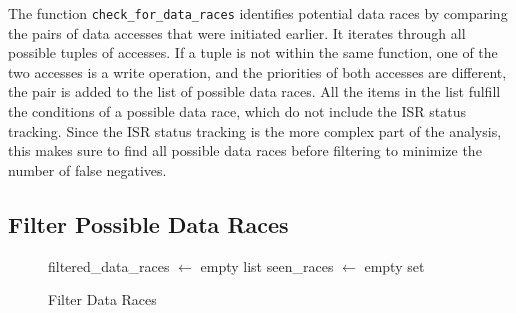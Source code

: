 \documentclass[
fancyheadings, %
%
%
]{stsreprt}
\begin{document}
{		The function \texttt{check\_for\_data\_races} identifies potential data races by comparing the pairs of data accesses that were initiated earlier. It iterates through all possible tuples of accesses. If a tuple is not within the same function, one of the two accesses is a write operation, and the priorities of both accesses are different, the pair is added to the list of possible data races. All the items in the list fulfill the conditions of a possible data race, which do not include the \ac{ISR} status tracking. Since the \ac{ISR} status tracking is the more complex part of the analysis, this makes sure to find all possible data races before filtering to minimize the number of false negatives.
		
		
		
		\subsection*{Filter Possible Data Races}
		
		\begin{figure}[H]
			\centering
			\begin{algorithm}[H]
				\caption{Filter Data Races}
				\DontPrintSemicolon
				\SetAlgoLined
				\BlankLine
				
				filtered\_data\_races $\gets$ empty list\;
				seen\_races $\gets$ empty set\;
				
				

\end{algorithm}
\end{figure}}
\end{document}

